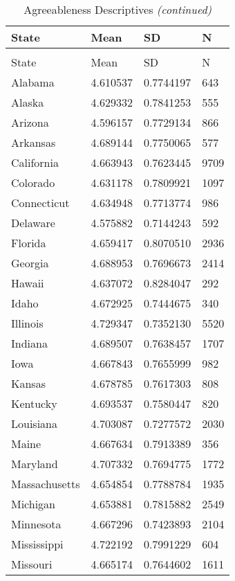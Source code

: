 \documentclass[
]{article}
\begin{document}
\begin{landscape}
\begin{longtable}[t]{llll}
\caption{\label{tab:KableOuput}Agreeableness Descriptives}\\
\toprule
State & Mean & SD & N\\
\midrule
\endfirsthead
\caption[]{\label{tab:KableOuput}Agreeableness Descriptives \textit{(continued)}}\\
\toprule
State & Mean & SD & N\\
\midrule
\endhead

\endfoot
\bottomrule
\endlastfoot
Alabama & 4.610537 & 0.7744197 & 643\\
Alaska & 4.629332 & 0.7841253 & 555\\
Arizona & 4.596157 & 0.7729134 & 866\\
Arkansas & 4.689144 & 0.7750065 & 577\\
California & 4.663943 & 0.7623445 & 9709\\
\addlinespace
Colorado & 4.631178 & 0.7809921 & 1097\\
Connecticut & 4.634948 & 0.7713774 & 986\\
Delaware & 4.575882 & 0.7144243 & 592\\
Florida & 4.659417 & 0.8070510 & 2936\\
Georgia & 4.688953 & 0.7696673 & 2414\\
\addlinespace
Hawaii & 4.637072 & 0.8284047 & 292\\
Idaho & 4.672925 & 0.7444675 & 340\\
Illinois & 4.729347 & 0.7352130 & 5520\\
Indiana & 4.689507 & 0.7638457 & 1707\\
Iowa & 4.667843 & 0.7655999 & 982\\
\addlinespace
Kansas & 4.678785 & 0.7617303 & 808\\
Kentucky & 4.693537 & 0.7580447 & 820\\
Louisiana & 4.703087 & 0.7277572 & 2030\\
Maine & 4.667634 & 0.7913389 & 356\\
Maryland & 4.707332 & 0.7694775 & 1772\\
\addlinespace
Massachusetts & 4.654854 & 0.7788784 & 1935\\
Michigan & 4.653881 & 0.7815882 & 2549\\
Minnesota & 4.667296 & 0.7423893 & 2104\\
Mississippi & 4.722192 & 0.7991229 & 604\\
Missouri & 4.665174 & 0.7644602 & 1611\\

\end{longtable}
\end{landscape}
\end{document}
